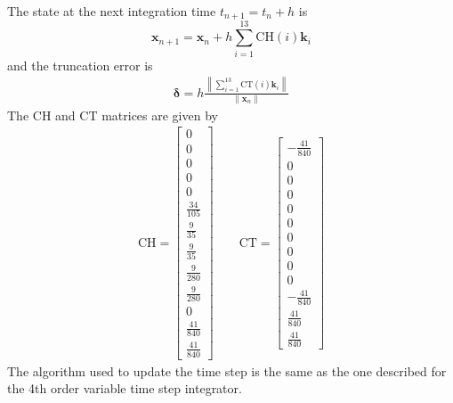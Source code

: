 The state at the next integration time $t_{n+1} = t_{n} + h$ is
\begin{equation}
	\bm x_{n+1} = \bm x_{n} + h \sum_{i=1}^{13}\text{CH}(i)\bm k_i
\end{equation}
and the truncation error is
\begin{align}
	\bm \delta = h\frac{\left\|
		\sum_{i=1}^{13}\text{CT}(i)\bm k_i \label{eq:Error_RKF78}
	\right\|}{\|\bm x_n\|}
\end{align}
The CH and CT matrices are given by
\begin{align}
	\text{CH} = \begin{bmatrix}
		0\\[6pt]
		0\\[6pt]
		0\\[6pt]
		0\\[6pt]
		0\\[6pt]
		\frac{34}{105}\\[6pt]
		\frac{9}{35}\\[6pt]
		\frac{9}{35}\\[6pt]
		\frac{9}{280}\\[6pt]
		\frac{9}{280}\\[6pt]
		0\\[6pt]
		\frac{41}{840}\\[6pt]
		\frac{41}{840}
	\end{bmatrix} \qquad \text{CT} = \begin{bmatrix}
		-\frac{41}{840}\\[6pt]
		0\\[6pt]
		0\\[6pt]
		0\\[6pt]
		0\\[6pt]
		0\\[6pt]
		0\\[6pt]
		0\\[6pt]
		0\\[6pt]
		0\\[6pt]
		-\frac{41}{840}\\[6pt]
		\frac{41}{840}\\[6pt]
		\frac{41}{840}
	\end{bmatrix}
\end{align}
The algorithm used to update the time step is the same as the one described for the 4th order variable time step integrator.
